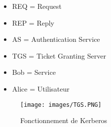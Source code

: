 \documentclass[a4paper]{article}
\begin{document}
      \begin{itemize}
        \item REQ = Request
        \item REP = Reply
        \item AS = Authentication Service
        \item TGS = Ticket Granting Server
        \item Bob = Service
        \item Alice = Utilisateur
      \end{itemize}

      \begin{figure}[H]
        \centering
        \texttt{[image: images/TGS.PNG]}
        \caption{Fonctionnement de Kerberos}
      \end{figure}
\end{document}
